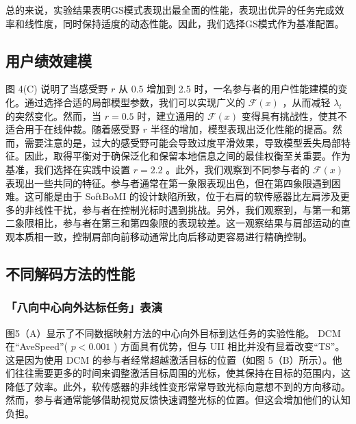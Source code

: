 总的来说，实验结果表明GS模式表现出最全面的性能，表现出优异的任务完成效率和线性度，同时保持适度的动态性能。因此，我们选择GS模式作为基准配置。  

\subsection{用户绩效建模  }    图 4(C) 说明了当感受野    $r$    从 0.5 增加到 2.5 时，一名参与者的用户性能建模的变化。通过选择合适的局部模型参数，我们可以实现广义的    $\mathcal{F}(x)$    ，从而减轻    $\lambda_t$    的突然变化。然而，当    $r=0.5$    时，建立通用的    $\mathcal{F}(x)$    变得具有挑战性，使其不适合用于在线仲裁。随着感受野    $r$    半径的增加，模型表现出泛化性能的提高。然而，需要注意的是，过大的感受野可能会导致过度平滑效果，导致模型丢失局部特征。因此，取得平衡对于确保泛化和保留本地信息之间的最佳权衡至关重要。作为基准，我们选择在实践中设置    $r=2.2$   。此外，我们观察到不同参与者的    $\mathcal{F}(x)$    表现出一些共同的特征。参与者通常在第一象限表现出色，但在第四象限遇到困难。这可能是由于 SoftBoMI 的设计缺陷所致，位于右肩的软传感器比左肩涉及更多的非线性干扰，参与者在控制光标时遇到挑战。另外，我们观察到，与第一和第二象限相比，参与者在第三和第四象限的表现较差。这一观察结果与肩部运动的直观本质相一致，控制肩部向前移动通常比向后移动更容易进行精确控制。  

\subsection{不同解码方法的性能  }     


\subsubsection{「八向中心向外达标任务」表演  }    图5（A）显示了不同数据映射方法的中心向外目标到达任务的实验性能。 DCM 在“AveSpeed”(    $p<0.001$    ) 方面具有优势，但与 UII 相比并没有显着改变“TS”。这是因为使用 DCM 的参与者经常超越激活目标的位置（如图 5（B）所示）。他们往往需要更多的时间来调整激活目标周围的光标，使其保持在目标的范围内，这降低了效率。此外，软传感器的非线性变形常常导致光标向意想不到的方向移动。然而，参与者通常能够借助视觉反馈快速调整光标的位置。但这会增加他们的认知负担。  

